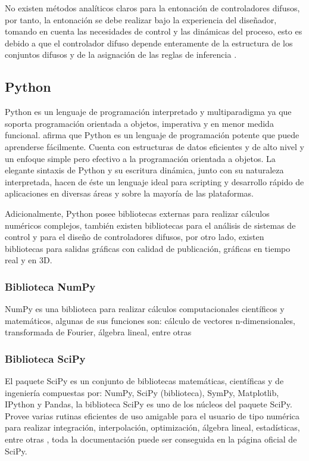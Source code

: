 			No existen métodos analíticos claros para la entonación de controladores difusos, por tanto, la entonación se debe realizar bajo la experiencia del diseñador, tomando en cuenta las necesidades de control y las dinámicas del proceso, esto es debido a que el controlador difuso depende enteramente de la estructura de los conjuntos difusos y de la asignación de las reglas de inferencia \Parencite{cruz2010inteligencia}.
		
	\subsection{Python}
		
		Python es un lenguaje de programación interpretado y multiparadigma ya que soporta programación orientada a objetos, imperativa y en menor medida funcional. \textcite{guido2017tutorial} afirma que Python es un lenguaje de programación potente que puede aprenderse fácilmente. Cuenta con estructuras de datos eficientes y de alto
		nivel y un enfoque simple pero efectivo a la programación orientada a objetos. La elegante sintaxis de Python y su escritura
		dinámica, junto con su naturaleza interpretada, hacen de éste un lenguaje ideal para scripting y desarrollo rápido de
		aplicaciones en diversas áreas y sobre la mayoría de las plataformas.
		
		Adicionalmente, Python posee bibliotecas externas para realizar cálculos numéricos complejos, también existen bibliotecas para el análisis de sistemas de control y para el diseño de controladores difusos, por otro lado, existen bibliotecas para salidas gráficas con calidad de publicación, gráficas en tiempo real y en 3D.
		
		\subsubsection{Biblioteca NumPy}

			NumPy es una biblioteca para realizar cálculos computacionales científicos y matemáticos, algunas de sus funciones son: cálculo de vectores n-dimensionales, transformada de Fourier, álgebra lineal, entre otras \Parencite{numpy}

		\subsubsection{Biblioteca SciPy}	

			El paquete SciPy es un conjunto de bibliotecas matemáticas, científicas y de ingeniería compuestas por: NumPy, SciPy (biblioteca), SymPy, Matplotlib, IPython y Pandas, la biblioteca SciPy es uno de los núcleos del paquete SciPy. Provee varias rutinas eficientes de uso amigable para el usuario de tipo numérica para realizar integración, interpolación, optimización, álgebra lineal, estadísticas, entre otras \Parencite{scipy}, toda la documentación puede ser conseguida en la página oficial de SciPy.
			
